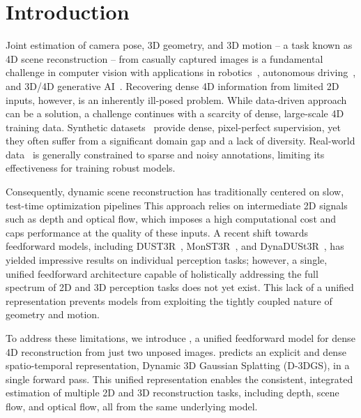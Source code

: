 
\section{Introduction}
\label{sec:intro}

Joint estimation of camera pose, 3D geometry, and 3D motion -- a task known as 4D scene reconstruction 
-- from casually captured images is a fundamental challenge in computer vision with applications in robotics~\citep{xu2024flow}, autonomous driving~\citep{geiger2012we}, and 3D/4D generative AI~\citep{yu20244real, liang2024diffusion4d, xie2024sv4d}. 
Recovering dense 4D information from limited 2D inputs, however, is an inherently ill-posed problem.
While data-driven approach can be a solution, a challenge continues with a scarcity of dense, large-scale 4D training data. 
Synthetic datasets~\citep{Zheng:2023:POA} provide dense, pixel-perfect supervision, yet they often suffer from a significant domain gap and a lack of diversity.
Real-world data~\citep{Jin:2025:S4D} is generally constrained to sparse and noisy annotations, limiting its effectiveness for training robust models. 

Consequently, dynamic scene reconstruction has traditionally centered on slow, test-time optimization pipelines
This approach relies on intermediate 2D signals such as depth and optical flow, which imposes a high computational cost and caps performance at the quality of these inputs.
A recent shift towards feedforward models, including DUST3R~\citep{Wang:2024:DUS}, MonST3R~\citep{Zhang:2025:MST}, and DynaDUSt3R~\citep{Jin:2025:S4D}, has yielded impressive results on individual perception tasks; however, a single, unified feedforward architecture capable of holistically addressing the full spectrum of 2D and 3D perception tasks does not yet exist.
This lack of a unified representation prevents models from exploiting the tightly coupled nature of geometry and motion.

To address these limitations, we introduce \ourmethod{}, a unified feedforward model for dense 4D reconstruction from just two unposed images.
\ourmethod{} predicts an explicit and dense spatio-temporal representation, Dynamic 3D Gaussian Splatting (D-3DGS), in a single forward pass.
This unified representation enables the consistent, integrated estimation of multiple 2D and 3D reconstruction tasks, including depth, scene flow, and optical flow, all from the same underlying model.

